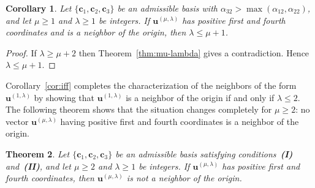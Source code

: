 \documentclass[12pt,a4paper]{amsart}
\newtheorem{theorem}{Theorem}[section]
\newtheorem{corollary}[theorem]{Corollary}
\theoremstyle{definition}
\begin{document}
\begin{corollary}\label{cor:mu-lambda}
Let $\{\mathbf c_1,\mathbf c_2,\mathbf c_3\}$ be an admissible basis
with $\alpha_{32}>\max(\alpha_{12},\alpha_{22})$, and let $\mu\ge1$
and $\lambda\ge1$ be integers.
If $\mathbf u^{(\mu,\lambda)}$ has positive first and
fourth coordinates and
is a neighbor of the origin, then $\lambda\le\mu+1$.
\end{corollary}

\begin{proof}
If $\lambda\ge\mu+2$ then Theorem~\ref{thm:mu-lambda} gives a
contradiction. Hence $\lambda\le\mu+1$.
\end{proof}

Corollary~\ref{cor:iff} completes the characterization of the
neighbors of the form $\mathbf u^{(1,\lambda)}$ by showing that
$\mathbf u^{(1,\lambda)}$ is a neighbor of the origin if and only if
$\lambda\le2$.
The following theorem shows that the situation changes completely for
$\mu\ge2$: no vector
$\mathbf u^{(\mu,\lambda)}$
having positive first and fourth coordinates is a neighbor of the
origin.

\begin{theorem}\label{thm:mu-never}
Let $\{\mathbf c_1,\mathbf c_2,\mathbf c_3\}$ be an admissible basis
satisfying conditions~\textup{\textbf{(I)}} and~\textup{\textbf{(II)}},
and let $\mu\ge2$ and $\lambda\ge1$ be integers.
If $\mathbf u^{(\mu,\lambda)}$ has positive first and
fourth coordinates,
then $\mathbf u^{(\mu,\lambda)}$ is not a neighbor of the origin.
\end{theorem}
\end{document}
